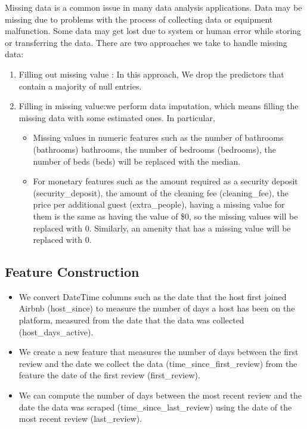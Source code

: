 Missing data is a common issue in many data analysis applications.  Data may be
missing due to problems with the process of collecting data or equipment
malfunction. Some data may get lost due to system or human error while storing
or transferring the data.  There are two approaches we take to handle missing
data:
\begin{enumerate}
    \item Filling out missing value : In this approach, We drop the predictors
that contain a majority of null entries.
    \item Filling in missing value:we perform data imputation, which means
        filling the missing data with some estimated ones. In particular,

        \begin{itemize}

            \item Missing values in numeric features such as the number of
                bathrooms (bathrooms) bathrooms, the number of bedrooms
                (bedrooms), the number of beds (beds) will be replaced with the
                median.

            \item For monetary features such as the amount required as a
                security deposit (security\_deposit), the amount of the cleaning
                fee (cleaning\_fee), the price per additional guest
                (extra\_people), having a missing value for them is the same as
                having the value of \$0, so the missing values will be replaced
                with 0. Similarly, an amenity that has a missing value will be replaced with 0.

        \end{itemize}
\end{enumerate}



\subsection{Feature Construction}

\begin{itemize}

    \item We convert DateTime columns such as the date that the host first joined Airbnb
    (host\_since) to measure the number of days a host has been on the platform,
    measured from the date that the data was collected (host\_days\_active).

    \item We create a new feature that measures the number of days between the first
        review and  the date we collect the data (time\_since\_first\_review) from
        the feature the date of the first review (first\_review).

    \item We can compute the number of days between the most recent review and
    the date the data was scraped (time\_since\_last\_review) using the date of the
    most recent review (last\_review).
\end{itemize}

